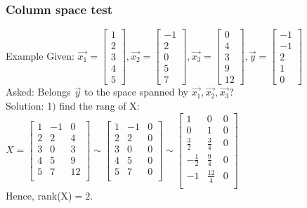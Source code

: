 \begin{frame}
	\frametitle{Column space test}
	\begin{block}{Example}
		Given: $\overrightarrow{x_1}=\begin{bmatrix} 1\\2\\3\\4\\5\end{bmatrix}, \overrightarrow{x_2}=\begin{bmatrix} -1\\2\\0\\5\\7\end{bmatrix}, \overrightarrow{x_3}=\begin{bmatrix} 0\\4\\3\\9\\12\end{bmatrix}, \overrightarrow{y}=\begin{bmatrix} -1\\-1\\2\\1\\0\end{bmatrix}$\\
		Asked: Belongs $\overrightarrow{y}$ to the space spanned by $\overrightarrow{x_1},\overrightarrow{x_2},\overrightarrow{x_3}$?\\
		Solution: 1$)$ find the rang of X:\\
		$X=\begin{bmatrix}
			1 & -1 & 0\\
			2 & 2 & 4\\
			3 & 0 & 3\\
			4 & 5 & 9\\
			5 & 7 & 12\\\end{bmatrix}\sim\begin{bmatrix}
			1 & -1 & 0\\
			2 & 2 & 0\\
			3 & 0 & 0\\
			4 & 5 & 0\\
			5 & 7 & 0\\
			\end{bmatrix}\sim\begin{bmatrix}
				1 & 0 & 0\\
				0 & 1 & 0\\
				\frac{3}{2} & \frac{3}{4} & 0\\
				-\frac{1}{2} & \frac{9}{4} & 0\\
				-1 & \frac{12}{4} & 0\\
			\end{bmatrix}$\\ Hence, rank(X)$=2$.
	\end{block}
\end{frame}


